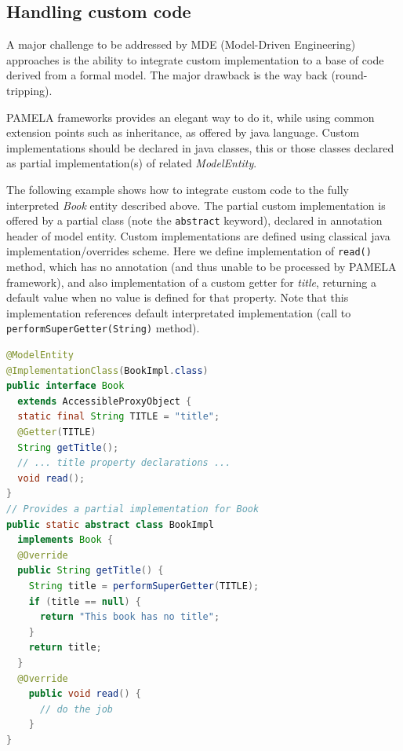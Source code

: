\subsection{Handling custom code}

A major challenge to be addressed by MDE (Model-Driven Engineering) approaches is the ability to integrate custom implementation to a base of code derived from a formal model. The major drawback is the way back (round-tripping).

PAMELA frameworks provides an elegant way to do it, while using common extension points such as inheritance, as offered by java language. Custom implementations should be declared in java classes, this or those classes declared as partial implementation(s) of related \emph{ModelEntity}. 

The following example shows how to integrate custom code to the fully interpreted \emph{Book} entity described above. The partial custom implementation is offered by a partial class (note the \texttt{abstract} keyword), declared in annotation header of model entity. Custom implementations are defined using classical java implementation/overrides scheme. Here we define implementation of \texttt{read()} method, which has no annotation (and thus unable to be processed by PAMELA framework), and also implementation of a custom getter for \emph{title}, returning a default value when no value is defined for that property. Note that this implementation references default interpretated implementation (call to \texttt{performSuperGetter(String)} method).

\begin{lstlisting}[language=Java,basicstyle=\ttfamily\footnotesize]
@ModelEntity
@ImplementationClass(BookImpl.class)
public interface Book 
  extends AccessibleProxyObject {
  static final String TITLE = "title";
  @Getter(TITLE)
  String getTitle();
  // ... title property declarations ...
  void read();
}
// Provides a partial implementation for Book
public static abstract class BookImpl 
  implements Book {
  @Override
  public String getTitle() {
    String title = performSuperGetter(TITLE);
    if (title == null) {
      return "This book has no title";
    }
    return title;
  }
  @Override
    public void read() {
      // do the job
    }
}
\end{lstlisting}

